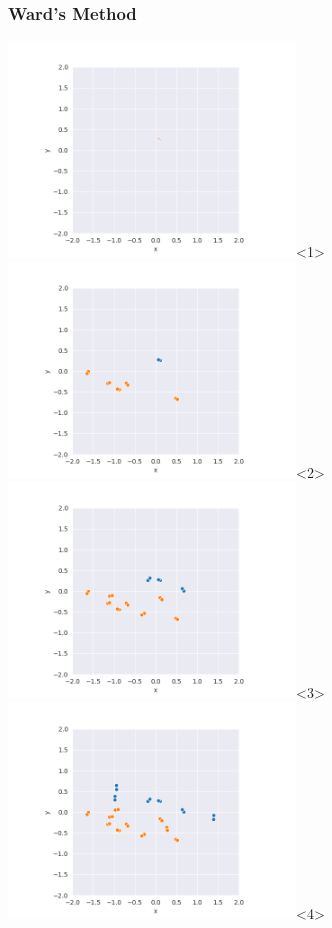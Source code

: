\begin{frame}
\frametitle{Ward's Method}
  \includegraphics[width=3in]{../png/ward_stretch/ward_stretch_1.png}<1>
  \includegraphics[width=3in]{../png/ward_stretch/ward_stretch_6.png}<2>
  \includegraphics[width=3in]{../png/ward_stretch/ward_stretch_11.png}<3>
  \includegraphics[width=3in]{../png/ward_stretch/ward_stretch_16.png}<4>

\end{frame}
